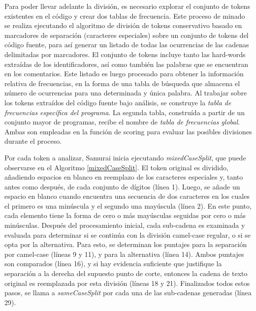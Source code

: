 Para poder llevar adelante la división, es necesario explorar el conjunto de tokens existentes en el código y crear dos tablas de frecuencia.
Este proceso de minado se realiza ejecutando el algoritmo de división de tokens conservativo basado en marcadores de separación (caracteres especiales) sobre un conjunto de tokens del código fuente, para así generar un listado de todas las ocurrencias de las cadenas delimitadas por marcadores.
El conjunto de tokens incluye tanto las hard-words extraídas de los identificadores, así como también las palabras que se encuentran en los comentarios.
Este listado es luego procesado para obtener la información relativa de frecuencias, en la forma de una tabla de búsqueda que almacena el número de ocurrencias para una determinada y única palabra.
Al trabajar sobre los tokens extraídos del código fuente bajo análisis, se construye  la \textit{tabla de frecuencias específica del programa}.
La segunda tabla, construída a partir de un conjunto mayor de programas, recibe el nombre de \textit{tabla de frecuencias global}.
Ambas son empleadas en la función de scoring para evaluar las posibles divisiones durante el proceso.

Por cada token a analizar, Samurai inicia ejecutando \textit{mixedCaseSplit}, que puede observarse en el Algoritmo \ref{mixedCaseSplit}.
El token original es dividido, añadiendo espacios en blanco en reemplazo de los caracteres especiales y, tanto antes como después, de cada conjunto de dígitos (línea 1).
Luego, se añade un espacio en blanco cuando encuentra una secuencia de dos caracteres en los cuales el primero es una minúscula y el segundo una mayúscula (línea 2).
En este punto, cada elemento tiene la forma de cero o más mayúsculas seguidas por cero o más minúsculas.
Después del procesamiento inicial, cada sub-cadena es examinada y evaluada para determinar si se continúa con la división camel-case regular, o si se opta por la alternativa.
Para esto, se determinan los puntajes para la separación por camel-case (líneas 9 y 11), y para la alternativa (línea 14).
Ambos puntajes son comparados (línea 16), y si hay evidencia suficiente que justifique la separación a la derecha del supuesto punto de corte, entonces la cadena de texto original es reemplazada por esta división (líneas 18 y 21).
Finalizados todos estos pasos, se llama a \textit{sameCaseSplit} por cada una de las sub-cadenas generadas (línea 29).

